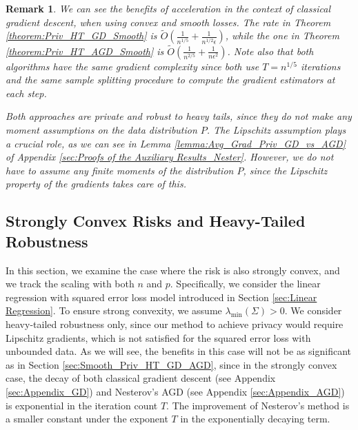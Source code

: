 \documentclass{article}
\newtheorem{remark}{\textbf{Remark}}
\begin{document}

\begin{remark}
\label{remark:compare_AGD_GD_Smooth}
We can see the benefits of acceleration in the context of classical gradient descent, when using convex and smooth losses. The rate in Theorem \ref{theorem:Priv_HT_GD_Smooth} is $\widetilde{O}\left(\frac{1}{n^{1/5}} + \frac{1}{n^{1/2}\epsilon}\right)$, while the one in Theorem \ref{theorem:Priv_HT_AGD_Smooth} is $\widetilde{O}\left(\frac{1}{n^{2/5}} + \frac{1}{n\epsilon^2}\right)$. Note also that both algorithms have the same gradient complexity since both use $T = n^{1/5}$ iterations and the same sample splitting procedure to compute the gradient estimators at each step. 

Both approaches are private and robust to heavy tails, since they do not make any moment assumptions on the data distribution $P$. The Lipschitz assumption plays a crucial role, as we can see in Lemma \ref{lemma:Avg_Grad_Priv_GD_vs_AGD} of Appendix \ref{sec:Proofs of the Auxiliary Results_Nester}. However, we do not have to assume any finite moments of the distribution $P$, since the Lipschitz property of the gradients takes care of this.
\end{remark}


\subsection{Strongly Convex Risks and Heavy-Tailed Robustness}\label{sec:Strongly Convex Risks}

In this section, we examine the case where the risk is also strongly convex, and we track the scaling with both $n$ and $p$. Specifically, we consider the linear regression with squared error loss model introduced in Section \ref{sec:Linear Regression}. To ensure strong convexity, we assume $\lambda_{\min}(\Sigma) > 0$. We consider heavy-tailed robustness only, since our method to achieve privacy would require Lipschitz gradients, which is not satisfied for the squared error loss with unbounded data. As we will see, the benefits in this case will not be as significant as in Section \ref{sec:Smooth_Priv_HT_GD_AGD}, since in the strongly convex case, the decay of both classical gradient descent (see Appendix \ref{sec:Appendix_GD}) and Nesterov's AGD (see Appendix \ref{sec:Appendix_AGD}) is exponential in the iteration count $T$. The improvement of Nesterov's method is a smaller constant under the exponent $T$ in the exponentially decaying term.
\end{document}
